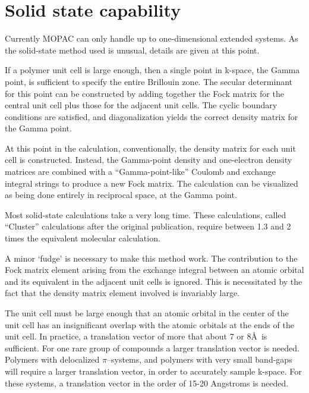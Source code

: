 \section{Solid state capability}
   Currently MOPAC can only  handle  up  to  one-dimensional  extended
   systems.   As  the solid-state method used is unusual, details are given
   at this point.

        If a polymer unit cell is large enough,  then  a  single  point  in
   k-space,  the Gamma point, is sufficient to specify the entire Brillouin
   zone.  The secular determinant for this  point  can  be  constructed  by
   adding together the Fock matrix for the central unit cell plus those for
   the adjacent unit cells.  The  cyclic boundary conditions
   are satisfied, and diagonalization yields the correct density matrix for
   the Gamma point.

        At this point  in  the  calculation,  conventionally,  the  density
   matrix  for  each  unit  cell  is constructed.  Instead, the Gamma-point
   density  and  one-electron  density  matrices  are   combined   with   a
   ``Gamma-point-like'' Coulomb  and  exchange integral strings to produce a
   new Fock matrix.  The  calculation  can  be  visualized  as  being  done
   entirely in reciprocal space, at the Gamma point.

        Most  solid-state  calculations  take  a  very  long  time.   These
   calculations,   called ``Cluster'' calculations   after  the  original
   publication, require between 1.3 and 2 times  the  equivalent  molecular
   calculation.

        A minor `fudge'  is  necessary  to  make  this  method  work.   The
   contribution  to  the  Fock  matrix  element  arising  from the exchange
   integral between an atomic orbital and its equivalent  in  the  adjacent
   unit  cells  is  ignored.   This  is  necessitated  by the fact that the
   density matrix element involved is invariably large.

        The unit cell must be large enough that an atomic  orbital  in  the
   center  of  the  unit  cell has an insignificant overlap with the atomic
   orbitals at the ends of the  unit  cell.   In  practice,  a  translation
   vector  of more that about 7 or 8\AA\ is sufficient.  For one rare
   group of compounds a larger translation vector is needed.  Polymers with
   delocalized  $\pi$--systems,  and  polymers  with  very small band-gaps will
   require a larger translation  vector,  in  order  to  accurately  sample
   k-space.   For these systems, a translation vector in the order of 
   15-20 Angstroms is needed.

